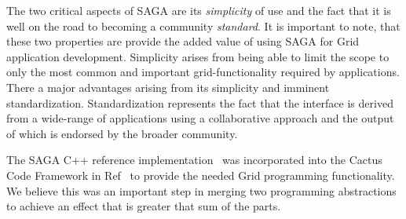 \documentclass[conference,final]{IEEEtran}
\begin{document}
The two critical aspects of SAGA are its {\it simplicity} of use and
the fact that it is well on the road to becoming a community {\it
  standard}.  It is important to note, that these two properties are
provide the added value of using SAGA for Grid application
development.  Simplicity arises from being able to limit the scope to
only the most common and important grid-functionality required by
applications.  There a major advantages arising from its simplicity
and imminent standardization.  Standardization represents the fact
that the interface is derived from a wide-range of applications using
a collaborative approach and the output of which is endorsed by the
broader community.

The SAGA C++ reference implementation~\cite{saga_web} was incorporated
into the Cactus Code Framework in Ref~\cite{escience07} to provide the
needed Grid programming functionality.  We believe this was an
important step in merging two programming abstractions to achieve an
effect that is greater that sum of the parts. 
\end{document}
